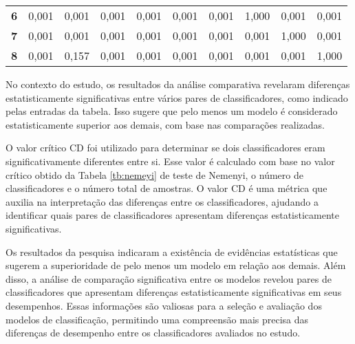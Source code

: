 \begin{table}[H]
\begin{tabular}{@{}clllllllll@{}}
		\textbf{6}                           & 0,001                          & 0,001                          & 0,001                          & 0,001                          & 0,001                          & 0,001                          & 1,000                          & 0,001                          & 0,001                          \\
		\textbf{7}                           & 0,001                          & 0,001                          & 0,001                          & 0,001                          & 0,001                          & 0,001                          & 0,001                          & 1,000                          & 0,001                          \\
		\textbf{8}                           & 0,001                          & 0,157                          & 0,001                          & 0,001                          & 0,001                          & 0,001                          & 0,001                          & 0,001                          & 1,000                          \\ \bottomrule
	\end{tabular}
	

\end{table}


No contexto do estudo, os resultados da análise comparativa revelaram diferenças estatisticamente significativas entre vários pares de classificadores, como indicado pelas entradas da tabela. Isso sugere que pelo menos um modelo é considerado estatisticamente superior aos demais, com base nas comparações realizadas.

O valor crítico CD foi utilizado para determinar se dois classificadores eram significativamente diferentes entre si. Esse valor é calculado com base no valor crítico obtido da Tabela \ref{tb:nemeyi} de teste de Nemenyi, o número de classificadores e o número total de amostras. O valor CD é uma métrica que auxilia na interpretação das diferenças entre os classificadores, ajudando a identificar quais pares de classificadores apresentam diferenças estatisticamente significativas.

Os resultados da pesquisa indicaram a existência de evidências estatísticas que sugerem a superioridade de pelo menos um modelo em relação aos demais. Além disso, a análise de comparação significativa entre os modelos revelou pares de classificadores que apresentam diferenças estatisticamente significativas em seus desempenhos. Essas informações são valiosas para a seleção e avaliação dos modelos de classificação, permitindo uma compreensão mais precisa das diferenças de desempenho entre os classificadores avaliados no estudo.


